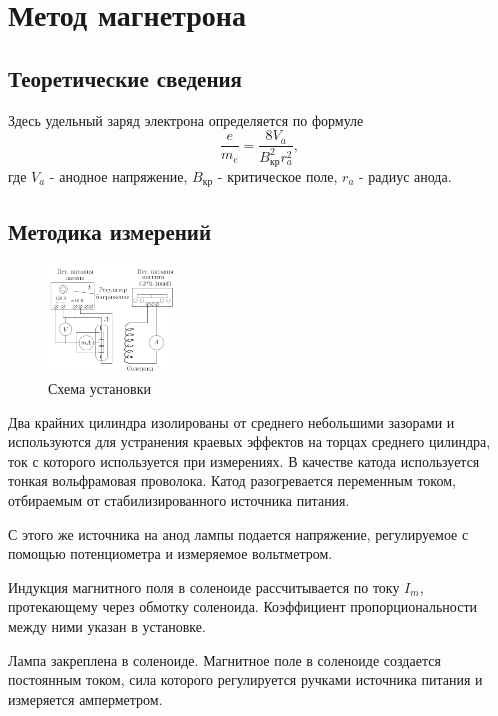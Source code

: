 \documentclass[a4paper, 12pt]{article}
\begin{document}
\section{Метод магнетрона}

\subsection{Теоретические сведения}

Здесь удельный заряд электрона определяется по формуле
\begin{equation}
\dfrac{e}{m_e} = \dfrac{8V_a}{B_{\text{кр}}^2r_a^2},
\end{equation}
где $V_a$ - анодное напряжение, $B_{\text{кр}}$ - критическое поле, $r_a$ - радиус анода.

\subsection{Методика измерений}

\begin{figure}
  \begin{center}
    \includegraphics[width = 0.3\textwidth]{2.png}
  \end{center}
  \caption{Схема установки}
\end{figure}
Два крайних цилиндра изолированы от среднего небольшими зазорами и используются для устранения краевых эффектов на торцах среднего цилиндра, ток с которого используется при измерениях. В качестве катода используется тонкая вольфрамовая проволока. Катод разогревается переменным током, отбираемым от стабилизированного источника питания. 

С этого же источника на анод лампы подается напряжение, регулируемое с помощью потенциометра и измеряемое вольтметром.

Индукция магнитного поля в соленоиде рассчитывается по току $I_m$, протекающему через обмотку соленоида. Коэффициент пропорциональности между ними указан в установке.

Лампа закреплена в соленоиде. Магнитное поле в соленоиде создается постоянным током, сила которого регулируется ручками источника питания и измеряется амперметром.
\end{document}

